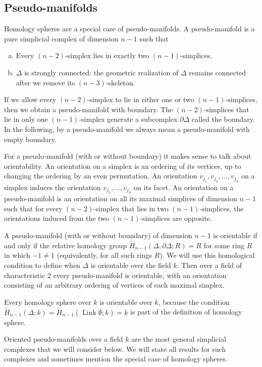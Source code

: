 \documentclass[10pt]{article}
\theoremstyle{definition}
\newcommand{\Link}{\operatorname{Link}}
\begin{document}
\subsection{Pseudo-manifolds}
Homology spheres are a special case of pseudo-manifolds. A pseudo-manifold is a pure simplicial complex of dimension $n-1$ such that
\begin{enumerate}[(a) ]
\item Every  $(n-2)$-simplex  lies in exactly two $(n-1)$-simplices.
\item $\Delta$ is strongly connected: the geometric realization of $\Delta$ remains connected after we remove its $(n-3)$-skeleton. 
\end{enumerate}
If we allow every $(n-2)$-simplex to lie in either one or two $(n-1)$-simplices, then we obtain a pseudo-manifold with boundary. The $(n-2)$-simplices that lie in only one $(n-1)$-simplex generate a subcomplex $\partial \Delta$ called the boundary. In the following, by a pseudo-manifold we always mean a pseudo-manifold with empty boundary.


For a pseudo-manifold (with or without boundary) it makes sense to talk about orientability. An orientation on a simplex is an ordering of its vertices, up to changing the ordering by an even permutation. An orientation $v_{j_1}, v_{j_2}, \ldots, v_{j_n}$ on a simplex induces the orientation $v_{j_2}, \ldots, v_{j_n}$ on its facet. An orientation on a pseudo-manifold is an orientation on all its maximal simplices of dimension $n-1$ such that for every $(n-2)$-simplex that lies in two $(n-1)$-simplices, the orientations induced from the two $(n-1)$-simplices are opposite.

A pseudo-manifold (with or without boundary) of dimension $n-1$ is orientable if and only if the relative homology group $\tilde{H}_{n-1}(\Delta, \partial\Delta; R) = R$ for some ring $R$ in which $-1\neq 1$   (equivalently, for all such rings $R$). We will use this homological condition to define when $\Delta$ is orientable over the field $k$. Then over a field of characteristic $2$ every pseudo-manifold is orientable, with an orientation consisting of an arbitrary ordering of vertices of each maximal simplex.

Every homology sphere over $k$ is orientable over $k$, because the condition $\tilde{H}_{n-1}(\Delta; k) = \tilde{H}_{n-1}(\Link \emptyset; k) = k$  is part of the definition of homology sphere. 

Oriented pseudo-manifolds over a field $k$ are the most general simplicial complexes that we will consider below. We will state all results for such complexes and sometimes mention the special case of homology spheres.
\end{document}
